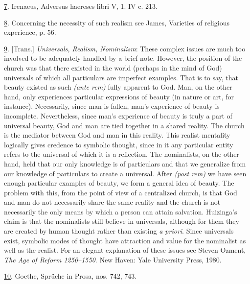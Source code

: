 \protect\hypertarget{23_NOTES.xhtmlux5cux23id_780}{\protect\hyperlink{16_Chapter_Nine__THE_DECLINE_OF_SYM.xhtmlux5cux23id_779}{7}}.
Irenaeus, Adversus haereses libri V, 1. IV c. 213.

\protect\hypertarget{23_NOTES.xhtmlux5cux23id_778}{\protect\hyperlink{16_Chapter_Nine__THE_DECLINE_OF_SYM.xhtmlux5cux23id_777}{8}}.
Concerning the necessity of such realism see James, Varieties of
religious experience, p. 56.

\protect\hypertarget{23_NOTES.xhtmlux5cux23id_776}{\protect\hyperlink{16_Chapter_Nine__THE_DECLINE_OF_SYM.xhtmlux5cux23id_775}{9}}.
{[}Trans.{]} \emph{Universals, Realism, Nominalism}: These complex
issues are much too involved to be adequately handled by a brief note.
However, the position of the church was that there existed in the world
(perhaps in the mind of God) universals of which all particulars are
imperfect examples. That is to say, that beauty existed as such
\emph{(ante rem)} fully apparent to God. Man, on the other hand, only
experiences particular expressions of beauty (in nature or art, for
instance). Necessarily, since man is fallen, man's experience of beauty
is incomplete. Nevertheless, since man's experience of beauty is truly a
part of universal beauty, God and man are tied together in a shared
reality. The church is the mediator between God and man in this reality.
This realist mentality logically gives credence to symbolic thought,
since in it any particular entity refers to the universal of which it is
a reflection. The nominalists, on the other hand, held that our only
knowledge is of particulars and that we generalize from our knowledge of
particulars to create a universal. After \emph{(post rem)} we have seen
enough particular examples of beauty, we form a general idea of beauty.
The problem with this, from the point of view of a centralized church,
is that God and man do not necessarily share the same reality and the
church is not necessarily the only means by which a person can attain
salvation. Huizinga's claim is that the nominalists still believe in
universals, although for them they are created by human thought rather
than existing \emph{a priori}. Since universals exist, symbolic modes of
thought have attraction and value for the nominalist as well as the
realist. For an elegant explanation of these issues see Steven Ozment,
\emph{The Age of Reform 1250--1550}. New Haven: Yale University Press,
1980.

\protect\hypertarget{23_NOTES.xhtmlux5cux23id_774}{\protect\hyperlink{16_Chapter_Nine__THE_DECLINE_OF_SYM.xhtmlux5cux23id_773}{10}}.
Goethe, Sprüche in Prosa, nos. 742, 743.


